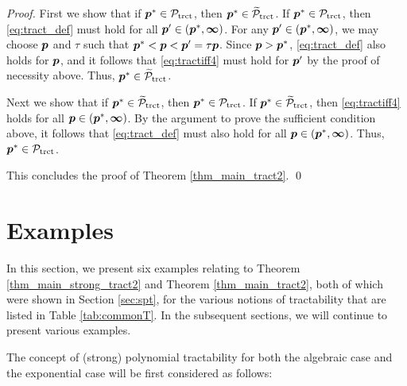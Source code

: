 \documentclass[sort&compress]{elsarticle}
\newcommand{\vinfty}{\boldsymbol{\infty}}
\begin{document}
\begin{proof}
First we show  that if $\boldsymbol{p}^* \in \mathcal{P}_{\textup{trct}}$, then $\boldsymbol{p}^* \in \widetilde{\mathcal{P}}_{\textup{trct}}$.  If $\boldsymbol{p}^* \in \mathcal{P}_{\textup{trct}}$, then \eqref{eq:tract_def} must hold for all $\vp' \in (\vp^*,\vinfty)$.  For any $\vp' \in (\vp^*,\vinfty)$, we may choose $\boldsymbol{p}$ and $\tau$ such that $\boldsymbol{p}^* < \boldsymbol{p} < \boldsymbol{p}' = \tau \boldsymbol{p}$. Since $\boldsymbol{p} > \boldsymbol{p}^*$, \eqref{eq:tract_def} also holds for $\boldsymbol{p}$, and it follows that \eqref{eq:tractiff4} must hold for $\boldsymbol{p}'$ by the proof of necessity above.  Thus, $\boldsymbol{p}^* \in \widetilde{\mathcal{P}}_{\textup{trct}}$.

Next we show that if $\boldsymbol{p}^* \in \widetilde{\mathcal{P}}_{\textup{trct}}$, then $\boldsymbol{p}^* \in \mathcal{P}_{\textup{trct}}$.  If $\boldsymbol{p}^* \in \widetilde{\mathcal{P}}_{\textup{trct}}$, then \eqref{eq:tractiff4}  holds for all $\vp \in (\vp^*,\vinfty)$.  By the argument to prove the sufficient condition above, it follows that \eqref{eq:tract_def} must also hold for all $\vp \in (\vp^*,\vinfty)$. Thus, $\boldsymbol{p}^* \in \mathcal{P}_{\textup{trct}}$.

\bigskip
\noindent This concludes the proof of Theorem \ref{thm_main_tract2}.  \qed
\end{proof}


\section{Examples} \label{sec:examples}
In this section, we present six examples relating to Theorem \ref{thm_main_strong_tract2} and Theorem \ref{thm_main_tract2}, both of which were shown in Section \ref{sec:spt}, for the various notions of tractability that are listed in Table \ref{tab:commonT}. In the subsequent sections, we will continue to present various examples.



The concept of (strong) polynomial tractability for both the algebraic case and the exponential case will be first considered as follows:


%
\end{document}
